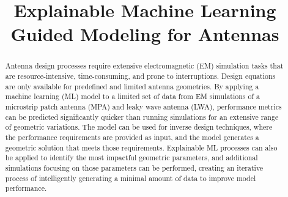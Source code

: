 \documentclass[conference]{IEEEtran}
\begin{document}
\title{Explainable Machine Learning Guided Modeling for Antennas\\
}

\author{
\and
{}
\and
{}
\and
{}
}

\maketitle

\begin{abstract}
    Antenna design processes require extensive electromagnetic (EM) simulation tasks that are resource-intensive, time-consuming, and prone to interruptions. Design equations are only available for predefined and limited antenna geometries. By applying a machine learning (ML) model to a limited set of data from EM simulations of a microstrip patch antenna (MPA) and leaky wave antenna (LWA), performance metrics can be predicted significantly quicker than running simulations for an extensive range of geometric variations. The model can be used for inverse design techniques, where the performance requirements are provided as input, and the model generates a geometric solution that meets those requirements. Explainable ML processes can also be applied to identify the most impactful geometric parameters, and additional simulations focusing on those parameters can be performed, creating an iterative process of intelligently generating a minimal amount of data to improve model performance.
\end{abstract}
\end{document}
